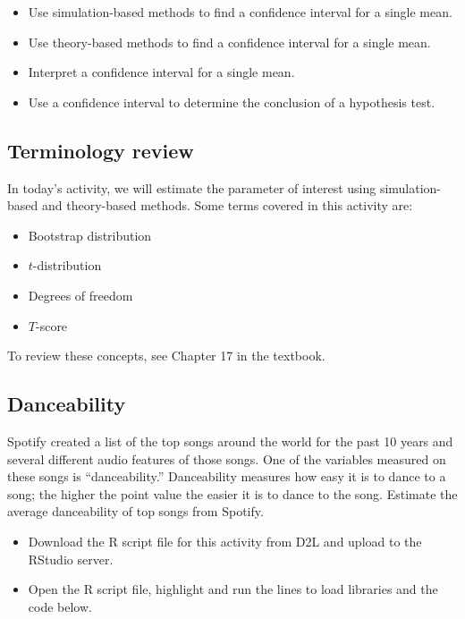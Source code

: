 \documentclass[
]{report}
\begin{document}
\begin{itemize}
\item
  Use simulation-based methods to find a confidence interval for a single mean.
\item
  Use theory-based methods to find a confidence interval for a single mean.
\item
  Interpret a confidence interval for a single mean.
\item
  Use a confidence interval to determine the conclusion of a hypothesis test.
\end{itemize}

\subsection{Terminology review}\label{terminology-review-12}

In today's activity, we will estimate the parameter of interest using simulation-based and theory-based methods. Some terms covered in this activity are:

\begin{itemize}
\item
  Bootstrap distribution
\item
  \(t\)-distribution
\item
  Degrees of freedom
\item
  \(T\)-score
\end{itemize}

To review these concepts, see Chapter 17 in the textbook.

\subsection{Danceability}\label{danceability}

Spotify created a list of the top songs around the world for the past 10 years and several different audio features of those songs. One of the variables measured on these songs is ``danceability.'' Danceability measures how easy it is to dance to a song; the higher the point value the easier it is to dance to the song. Estimate the average danceability of top songs from Spotify.

\begin{itemize}
\item
  Download the R script file for this activity from D2L and upload to the RStudio server.
\item
  Open the R script file, highlight and run the lines to load libraries and the code below.
\end{itemize}
\end{document}
